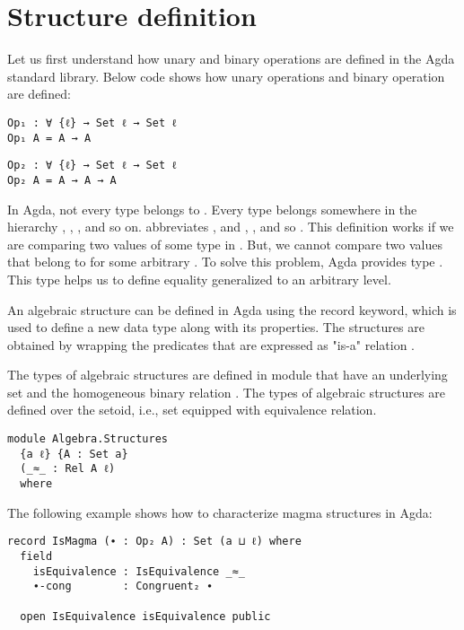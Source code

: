 \section{Structure definition}
Let us first understand how unary and binary operations are defined in the Agda
standard library. Below code shows how unary operations  and binary
operation  are defined:

\begin{verbatim}
Op₁ : ∀ {ℓ} → Set ℓ → Set ℓ
Op₁ A = A → A
\end{verbatim}
\begin{verbatim}
Op₂ : ∀ {ℓ} → Set ℓ → Set ℓ
Op₂ A = A → A → A
\end{verbatim}

In Agda, not every type belongs to . Every type belongs somewhere in
the hierarchy , , , and so on.
 abbreviates , and , , and so  \cite{plfa22.08}. This definition works if we are comparing two
values of some type in . But, we cannot compare two values that
belong to  for some arbitrary . To solve this problem,
Agda provides type . This type helps us to define equality
generalized to an arbitrary level.

An algebraic structure can be defined in Agda using the record keyword, which is
used to define a new data type along with its properties. The structures are
obtained by wrapping the predicates that are expressed as "is-a" relation
\cite{hu2021formalizing}.

The types of algebraic structures are defined in module
 that have an underlying set  and the
homogeneous binary relation . The types of algebraic structures are
defined over the setoid, i.e., set equipped with equivalence relation. 

\begin{verbatim}
module Algebra.Structures
  {a ℓ} {A : Set a} 
  (_≈_ : Rel A ℓ)    
  where
\end{verbatim}

The following example shows how to characterize magma
structures in Agda:
\begin{verbatim}
record IsMagma (∙ : Op₂ A) : Set (a ⊔ ℓ) where
  field
    isEquivalence : IsEquivalence _≈_
    ∙-cong        : Congruent₂ ∙

  open IsEquivalence isEquivalence public
\end{verbatim}

